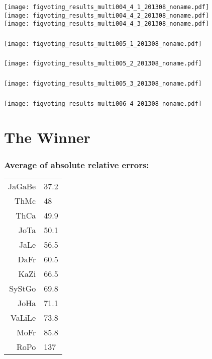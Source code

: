 \begin{frame}
  \frametitle{}

  \texttt{[image: figvoting\_results\_multi004\_4\_1\_201308\_noname.pdf]}\\
  \texttt{[image: figvoting\_results\_multi004\_4\_2\_201308\_noname.pdf]}\\
  \texttt{[image: figvoting\_results\_multi004\_4\_3\_201308\_noname.pdf]}

\end{frame}

\begin{frame}[plain]
  \frametitle{}

  \texttt{[image: figvoting\_results\_multi005\_1\_201308\_noname.pdf]}

\end{frame}

\begin{frame}[plain]
  \frametitle{}

  \texttt{[image: figvoting\_results\_multi005\_2\_201308\_noname.pdf]}

\end{frame}

\begin{frame}[plain]
  \frametitle{}

  \texttt{[image: figvoting\_results\_multi005\_3\_201308\_noname.pdf]}

\end{frame}

\begin{frame}[plain]
  \frametitle{}

  \texttt{[image: figvoting\_results\_multi006\_4\_201308\_noname.pdf]}

\end{frame}

\section{The Winner}

\begin{frame}
  \small
  \frametitle{Average of absolute relative errors:}

  \begin{tabular}{rl}
    JaGaBe & 37.2 \\ 
    ThMc &   48 \\ 
    ThCa & 49.9 \\ 
    JoTa & 50.1 \\ 
    JaLe & 56.5 \\ 
    DaFr & 60.5 \\ 
    KaZi & 66.5 \\ 
    SyStGo & 69.8 \\ 
    JoHa & 71.1 \\ 
    VaLiLe & 73.8 \\ 
    MoFr & 85.8 \\ 
    RoPo &  137 \\ 
  \end{tabular}

\end{frame}



